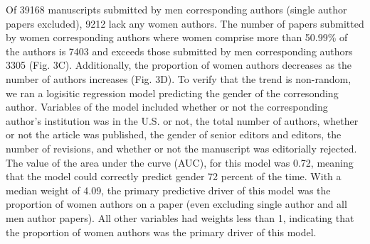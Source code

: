 \documentclass[11pt,]{article}
\begin{document}
Of 39168 manuscripts submitted by men corresponding authors (single
author papers excluded), 9212 lack any women authors. The number of
papers submitted by women corresponding authors where women comprise
more than 50.99\% of the authors is 7403 and exceeds those submitted by
men corresponding authors 3305 (Fig. 3C). Additionally, the proportion
of women authors decreases as the number of authors increases (Fig. 3D).
To verify that the trend is non-random, we ran a logisitic regression
model predicting the gender of the corresonding author. Variables of the
model included whether or not the corresponding author's institution was
in the U.S. or not, the total number of authors, whether or not the
article was published, the gender of senior editors and editors, the
number of revisions, and whether or not the manuscript was editorially
rejected. The value of the area under the curve (AUC), for this model
was 0.72, meaning that the model could correctly predict gender 72
percent of the time. With a median weight of 4.09, the primary
predictive driver of this model was the proportion of women authors on a
paper (even excluding single author and all men author papers). All
other variables had weights less than 1, indicating that the proportion
of women authors was the primary driver of this model.
\end{document}
